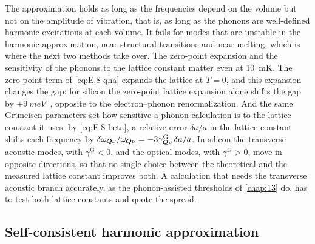The approximation holds as long as the frequencies depend on the volume but not on the amplitude of vibration, that is, as long as the phonons are well-defined harmonic excitations at each volume. It fails for modes that are unstable in the harmonic approximation, near structural transitions and near melting, which is where the next two methods take over. The zero-point expansion and the sensitivity of the phonons to the lattice constant matter even at \SI{10}{mK}. The zero-point term of \cref{eq:E.8-qha} expands the lattice at $T = 0$, and this expansion changes the gap: for silicon the zero-point lattice expansion alone shifts the gap by $+\SI{9}{meV}$~\cite[Table~S2]{miglio2020predominance}, opposite to the electron--phonon renormalization. And the same Grüneisen parameters set how sensitive a phonon calculation is to the lattice constant it uses: by \cref{eq:E.8-beta}, a relative error $\delta a/a$ in the lattice constant shifts each frequency by $\delta\omega_{\bm{Q}\nu}/\omega_{\bm{Q}\nu} = -3\gamma^{\mathrm{G}}_{\bm{Q}\nu}\,\delta a/a$. In silicon the transverse acoustic modes, with $\gamma^{\mathrm{G}} < 0$, and the optical modes, with $\gamma^{\mathrm{G}} > 0$, move in opposite directions, so that no single choice between the theoretical and the measured lattice constant improves both. A calculation that needs the transverse acoustic branch accurately, as the phonon-assisted thresholds of \cref{chap:13} do, has to test both lattice constants and quote the spread.

\subsection{Self-consistent harmonic approximation}


